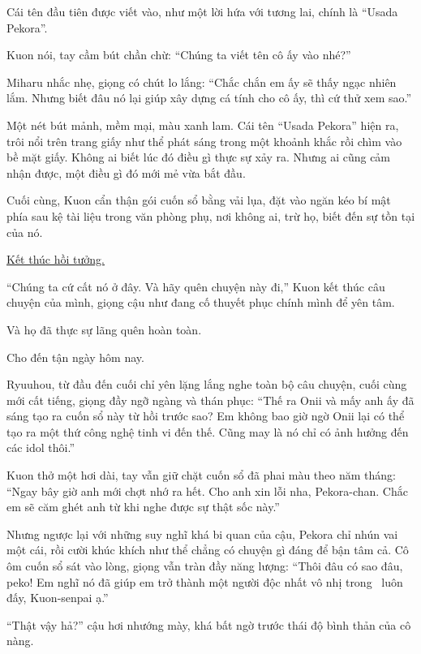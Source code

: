 \documentclass[../main.tex]{subfiles}
\begin{document}
Cái tên đầu tiên được viết vào, như một lời hứa với tương lai, chính là ``Usada Pekora''.

Kuon nói, tay cầm bút chần chừ: ``Chúng ta viết tên cô ấy vào nhé?''

Miharu nhắc nhẹ, giọng có chút lo lắng: ``Chắc chắn em ấy sẽ thấy ngạc nhiên lắm. Nhưng biết đâu nó lại giúp xây dựng cá tính cho cô ấy, thì cứ thử xem sao.''

Một nét bút mảnh, mềm mại, màu xanh lam. Cái tên ``Usada Pekora'' hiện ra, trôi nổi trên trang giấy như thể phát sáng trong một khoảnh khắc rồi chìm vào bề mặt giấy. Không ai biết lúc đó điều gì thực sự xảy ra. Nhưng ai cũng cảm nhận được, một điều gì đó mới mẻ vừa bắt đầu.

Cuối cùng, Kuon cẩn thận gói cuốn sổ bằng vải lụa, đặt vào ngăn kéo bí mật phía sau kệ tài liệu trong văn phòng phụ, nơi không ai, trừ họ, biết đến sự tồn tại của nó.

\begin{center}
  \uline{Kết thúc hồi tưởng.}
\end{center}

``Chúng ta cứ cất nó ở đây. Và hãy quên chuyện này đi,'' Kuon kết thúc câu chuyện của mình, giọng cậu như đang cố thuyết phục chính mình để yên tâm.

Và họ đã thực sự lãng quên hoàn toàn.

Cho đến tận ngày hôm nay.

Ryuuhou, từ đầu đến cuối chỉ yên lặng lắng nghe toàn bộ câu chuyện, cuối cùng mới cất tiếng, giọng đầy ngỡ ngàng và thán phục: ``Thế ra Onii và mấy anh ấy đã sáng tạo ra cuốn sổ này từ hồi trước sao? Em không bao giờ ngờ Onii lại có thể tạo ra một thứ công nghệ tinh vi đến thế. Cũng may là nó chỉ có ảnh hưởng đến các idol thôi.''

Kuon thở một hơi dài, tay vẫn giữ chặt cuốn sổ đã phai màu theo năm tháng: ``Ngay bây giờ anh mới chợt nhớ ra hết. Cho anh xin lỗi nha, Pekora-chan. Chắc em sẽ căm ghét anh từ khi nghe được sự thật sốc này.''

Nhưng ngược lại với những suy nghĩ khá bi quan của cậu, Pekora chỉ nhún vai một cái, rồi cười khúc khích như thể chẳng có chuyện gì đáng để bận tâm cả. Cô ôm cuốn sổ sát vào lòng, giọng vẫn tràn đầy năng lượng: ``Thôi đâu có sao đâu, peko! Em nghĩ nó đã giúp em trở thành một người độc nhất vô nhị trong \hll\ luôn đấy, Kuon-senpai ạ.''

``Thật vậy hả?'' cậu hơi nhướng mày, khá bất ngờ trước thái độ bình thản của cô nàng.
\end{document}

